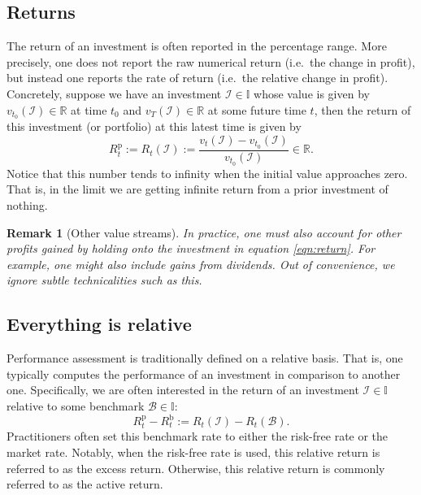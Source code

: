 \documentclass[12pt]{article}
\newtheorem{remark}{Remark}[section]
\begin{document}
\subsection{Returns}
The return of an investment is often reported in the percentage range. More precisely, one does not report the raw numerical return (i.e.\ the change in profit), but instead one reports the rate of return (i.e.\ the relative change in profit). Concretely, suppose we have an investment $\mathcal{I} \in \mathbb{I}$ whose value is given by $v_{t_0}(\mathcal{I}) \in \mathbb{R}$ at time $t_0$ and $v_T(\mathcal{I}) \in \mathbb{R}$ at some future time $t$, then the return of this investment (or portfolio) at this latest time is given by
\begin{equation}
    R_t^{\text{p}} := R_t(\mathcal{I}) := \frac{v_t(\mathcal{I}) - v_{t_0}(\mathcal{I})}{v_{t_0}(\mathcal{I})} \in \mathbb{R}.
    \label{eqn:return}
\end{equation}
Notice that this number tends to infinity when the initial value approaches zero. That is, in the limit we are getting infinite return from a prior investment of nothing.

\begin{remark}
	[Other value streams] In practice, one must also account for other profits gained by holding onto the investment in equation \eqref{eqn:return}. For example, one might also include gains from dividends. Out of convenience, we ignore subtle technicalities such as this.
\end{remark}
\subsection{Everything is relative}
Performance assessment is traditionally defined on a relative basis. That is, one typically computes the performance of an investment in comparison to another one. Specifically, we are often interested in the return of an investment $\mathcal{I} \in \mathbb{I}$ relative to some benchmark $\mathcal{B} \in \mathbb{I}$:
\begin{equation}
    R_t^{\text{p}} - R_t^{\text{b}} := R_t(\mathcal{I}) - R_t(\mathcal{B}).
    \label{eqn:relative_return}
\end{equation}
Practitioners often set this benchmark rate to either the risk-free rate or the market rate. Notably, when the risk-free rate is used, this relative return is referred to as the excess return. Otherwise, this relative return is commonly referred to as the active return.
\end{document}
